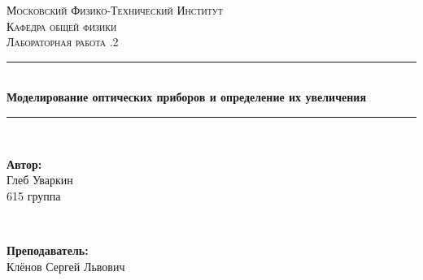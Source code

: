 \documentclass[a4paper, 12pt, twoside]{article}
\begin{document}
	\begin{titlepage}
		
		\newcommand{\HRule}{\rule{\linewidth}{0.7mm}} %
		
		\center %
		
		
		\textsc{\LARGE Московский Физико-Технический Институт}\\[1,5cm] %
		\textsc{\Large Кафедра общей физики}\\[0.5cm] %
		\textsc{\large Лабораторная работа .2}\\[0.5cm] %
		
		
		\HRule
		\\[0.4cm]
		{ \huge \bfseries Моделирование оптических приборов и определение их увеличения}
		\\[0.2cm] %
		\HRule
		\\[1.5cm]
		
		
		
		
		\begin{minipage}{0.4\textwidth}
			\begin{flushleft} \large
				\textbf{Автор:}\\
				Глеб Уваркин \\
				615 группа
			\end{flushleft}
		\end{minipage}
		~
		\begin{minipage}{0.4\textwidth}
			\begin{flushright} \large
				\textbf {Преподаватель:} \\
				Клёнов Сергей Львович %
			\end{flushright}
		\end{minipage}
		

\end{titlepage}
\end{document}
